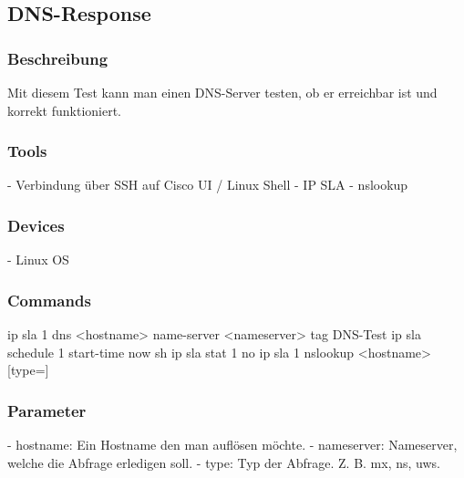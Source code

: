 \documentclass[a4,12pt]{scrartcl}
\begin{document}
\subsection{DNS-Response}
\subsubsection{Beschreibung}
Mit diesem Test kann man einen DNS-Server testen, ob er erreichbar ist und korrekt funktioniert.
\subsubsection{Tools}
- Verbindung über SSH auf Cisco UI / Linux Shell\newline
- IP SLA\newline
- nslookup\newline
\subsubsection{Devices}
- Linux OS
\subsubsection{Commands}
\newline
ip sla 1\newline
dns <hostname> name-server <nameserver>\newline
tag DNS-Test\newline
ip sla schedule 1 start-time now\newline
sh ip sla stat 1\newline
no ip sla 1\newline
{}
nslookup <hostname> [type=]
\subsubsection{Parameter}
- hostname: Ein Hostname den man auflösen möchte.\newline
- nameserver: Nameserver, welche die Abfrage erledigen soll.\newline
- type: Typ der Abfrage. Z. B. mx, ns, uws.\newline
\end{document}
